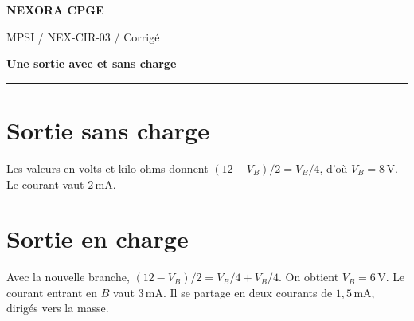 \documentclass[11pt,a4paper]{article}
\begin{document}
{\small\bfseries\color{nexorablue} NEXORA CPGE}\par
{\small MPSI / NEX-CIR-03 / Corrigé}\par
{\LARGE\bfseries Une sortie avec et sans charge}\par
\vspace{0.25em}\hrule\vspace{0.6em}

\section*{Sortie sans charge}
Les valeurs en volts et kilo-ohms donnent $(12-V_B)/2=V_B/4$, d’où $V_B=8\,\mathrm V$. Le courant vaut $2\,\mathrm{mA}$.

\section*{Sortie en charge}
Avec la nouvelle branche, $(12-V_B)/2=V_B/4+V_B/4$. On obtient $V_B=6\,\mathrm V$. Le courant entrant en $B$ vaut $3\,\mathrm{mA}$. Il se partage en deux courants de $1{,}5\,\mathrm{mA}$, dirigés vers la masse.
\end{document}
